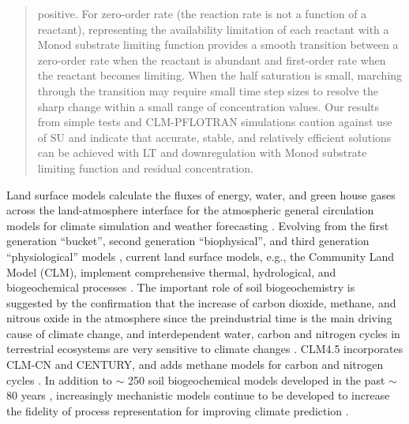 \documentclass[gmd, manuscript]{copernicus}
\begin{document}
\begin{abstract}
positive. For zero-order rate (the reaction rate is not a function of a
reactant), representing the availability limitation of each reactant with a
Monod substrate limiting function provides a smooth transition between a
zero-order rate when the reactant is abundant and first-order rate when the
reactant becomes limiting. When the half saturation is small, marching through
the transition may require small time step sizes to resolve the sharp change
within a small range of concentration values. Our results from simple
tests and CLM-PFLOTRAN simulations caution against use of SU and indicate that
accurate, stable, and relatively efficient solutions can be achieved with LT
and downregulation with Monod substrate limiting function and residual
concentration.
\end{abstract}

\clearpage

%

\introduction  %
Land surface models calculate the fluxes of energy, water, and green house
gases across the land-atmosphere interface for the atmospheric general
circulation models for climate simulation and weather forecasting \citep{Sellers1997}. Evolving
from the first generation ``bucket'', second generation ``biophysical'', and
third generation ``physiological'' models \citep{Sellers1997,Seneviratne2010},
current land surface models, e.g., the Community Land Model (CLM), implement
comprehensive thermal, hydrological, and biogeochemical processes
\citep{Oleson2013}. The important role of soil biogeochemistry is suggested by
the confirmation that the increase of carbon dioxide, methane, and nitrous oxide
in the atmosphere since the preindustrial time is the main driving cause of
climate change, and interdependent water, carbon and nitrogen cycles in
terrestrial ecosystems are very sensitive to climate changes \citep{IPCC2013}.
CLM4.5 incorporates CLM-CN and CENTURY, and adds methane models for carbon and
nitrogen cycles \citep{Oleson2013}. In addition to $\sim$ 250 soil biogeochemical
models developed in the past $\sim$ 80 years \citep{Manzoni2009}, increasingly
mechanistic models continue to be developed to increase the fidelity of
process representation for improving climate prediction
\citep[e.g.,][]{Wang2012,Riley2014}. 
\end{document}
